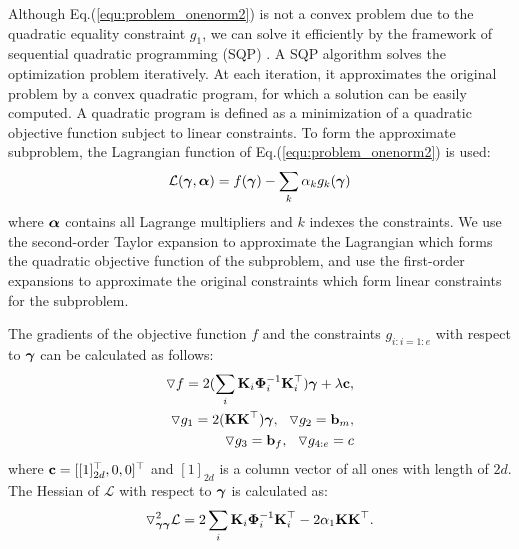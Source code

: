 \documentclass[10pt,letterpaper]{article}
\newcommand{\matrx}[1]{\ensuremath\boldsymbol{\rm #1}}
\newcommand{\vect}[1]{\ensuremath\boldsymbol{\rm #1}}
\begin{document}
Although Eq.(\ref{equ:problem_onenorm2}) is not a convex problem due to the quadratic equality constraint $g_1$, we can solve it efficiently by the framework of sequential quadratic programming (SQP) \cite{Nocedal:06}. A SQP algorithm solves the optimization problem iteratively. At each iteration, it approximates the original problem by a convex quadratic program, for which a solution can be easily computed. A quadratic program is defined as a minimization of a quadratic objective function subject to linear constraints. To form the approximate subproblem, the Lagrangian function of Eq.(\ref{equ:problem_onenorm2}) is used:
\begin{equation}
\label{equ:problem_onenorm_lagrangian}
\mathcal{L}(\vect \gamma, \vect \alpha)=f(\vect \gamma)- \sum_k\alpha_k g_k(\vect \gamma)
\end{equation}
where $\vect \alpha$ contains all Lagrange multipliers and $k$ indexes the constraints. We use the second-order Taylor expansion to approximate the Lagrangian which forms the quadratic objective function of the subproblem, and use the first-order expansions to approximate the original constraints which form linear constraints for the subproblem.

The gradients of the objective function $f$ and the constraints $g_{i:i=1:e}$ with respect to $\vect \gamma$ can be calculated as follows:
\begin{equation*}
\begin{split}
\triangledown f = 2(\sum_i \matrx K_i \matrx \Phi_i^{-1} \matrx K_i^\top) \vect \gamma + \lambda \vect c,\\ \triangledown g_1 = 2(\matrx K \matrx K^\top) \vect \gamma, ~~\triangledown g_2 = \vect b_m, \\
\triangledown g_3 = \vect b_f, ~~\triangledown g_{4:e} = c
\end{split}
\end{equation*} where $\vect c = [[1]_{2d}^\top, 0, 0]^\top$ and $[1]_{2d}$ is a column vector of all ones with length of $2d$.
The Hessian of $\mathcal{L}$ with respect to $\vect \gamma$ is calculated as:
\begin{equation}
\label{equ:problem_onenorm_hessian}
\triangledown^2_{\vect\gamma \vect\gamma}\mathcal{L} = 2\sum_i \matrx K_i \matrx \Phi_i^{-1} \matrx K_i^\top - 2\alpha_1\matrx K \matrx K^\top.
\end{equation}
\end{document}
